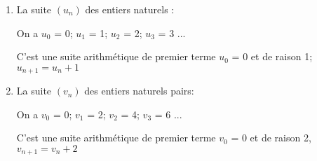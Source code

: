 \begin{myex}
	\begin{enumerate}
		\item La suite $(u_n)$ des entiers naturels : 
		
		On a $u_0$ = 0; $u_1$ = 1; $u_2$ = 2; $u_3$ = 3 ...
		
		C'est une suite arithmétique de premier terme $u_0$ = 0 et de raison 1; \\ $u_{n+1} = u_n + 1 $
		
		\item La suite $(v_n)$ des entiers naturels pairs: 
		
		On a $v_0$ = 0; $v_1$ = 2; $v_2$ = 4; $v_3$ = 6 ...
		
		C'est une suite arithmétique de premier terme $v_0$ = 0 et de raison 2,\\ $v_{n+1} = v_n + 2 $
	\end{enumerate}
\end{myex}